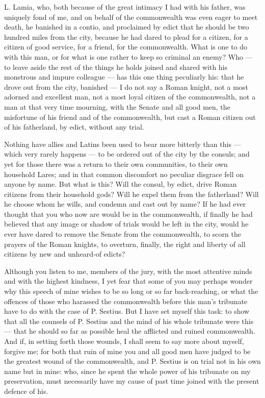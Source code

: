  L. Lamia, who, both because of the great intimacy I had with his father, was uniquely fond of me, and on behalf of the commonwealth was even eager to meet death, he banished in a contio, and proclaimed by edict that he should be two hundred miles from the city, because he had dared to plead for a citizen, for a citizen of good service, for a friend, for the commonwealth. What is one to do with this man, or for what is one rather to keep so criminal an enemy? Who --- to leave aside the rest of the things he holds joined and shared with his monstrous and impure colleague --- has this one thing peculiarly his: that he drove out from the city, banished --- I do not say a Roman knight, not a most adorned and excellent man, not a most loyal citizen of the commonwealth, not a man at that very time mourning, with the Senate and all good men, the misfortune of his friend and of the commonwealth, but cast a Roman citizen out of his fatherland, by edict, without any trial.

 Nothing have allies and Latins been used to bear more bitterly than this --- which very rarely happens --- to be ordered out of the city by the consuls; and yet for those there was a return to their own communities, to their own household Lares; and in that common discomfort no peculiar disgrace fell on anyone by name. But what is this? Will the consul, by edict, drive Roman citizens from their household gods? Will he expel them from the fatherland? Will he choose whom he wills, and condemn and cast out by name? If he had ever thought that you who now are would be in the commonwealth, if finally he had believed that any image or shadow of trials would be left in the city, would he ever have dared to remove the Senate from the commonwealth, to scorn the prayers of the Roman knights, to overturn, finally, the right and liberty of all citizens by new and unheard-of edicts?

 Although you listen to me, members of the jury, with the most attentive minds and with the highest kindness, I yet fear that some of you may perhaps wonder why this speech of mine wishes to be so long or so far back-reaching, or what the offences of those who harassed the commonwealth before this man's tribunate have to do with the case of P. Sestius. But I have set myself this task: to show that all the counsels of P. Sestius and the mind of his whole tribunate were this --- that he should so far as possible heal the afflicted and ruined commonwealth. And if, in setting forth those wounds, I shall seem to say more about myself, forgive me; for both that ruin of mine you and all good men have judged to be the greatest wound of the commonwealth, and P. Sestius is on trial not in his own name but in mine: who, since he spent the whole power of his tribunate on my preservation, must necessarily have my cause of past time joined with the present defence of his.

